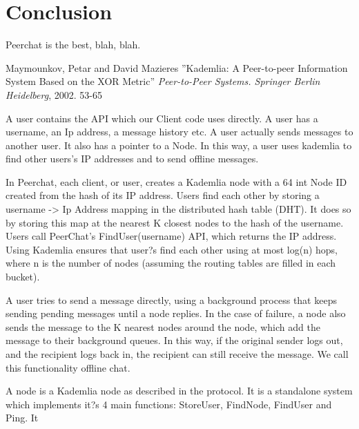 \documentclass{article}
\begin{document}
\section{Conclusion}

Peerchat is the best, blah, blah.

\begin{thebibliography}{99}
   Maymounkov, Petar and David Mazieres
   ''Kademlia: A Peer-to-peer Information System Based on the XOR Metric''
   \textit{Peer-to-Peer Systems. Springer Berlin Heidelberg}, 2002. 53-65
 
\end{thebibliography}

A user contains the API which our Client code uses directly. A user has a username, an Ip address, a message history etc. A user actually sends messages to another user. It also has a pointer to a Node. In this way, a user uses kademlia to find other users's IP addresses and to send offline messages.

In Peerchat, each client, or user, creates a Kademlia node with a 64 int Node ID created from the hash of its IP address. Users find each other by storing a username -> Ip Address mapping in the distributed hash table (DHT). It does so by storing this map at the nearest K closest nodes to the hash of the username. Users call PeerChat's FindUser(username) API, which returns the IP address. Using Kademlia ensures that user?s find each other using at most log(n) hops, where n is the number of nodes (assuming the routing tables are filled in each bucket). 

A user tries to send a message directly, using a background process that keeps sending pending messages until a node replies. In the case of failure, a node also sends the message to the K nearest nodes around the node, which add the message to their background queues. In this way, if the original sender logs out, and the recipient logs back in, the recipient can still receive the message. We call this functionality offline chat.

A node is a Kademlia node as described in the protocol. It is a standalone system which implements it?s 4 main functions: StoreUser, FindNode, FindUser and Ping. It 
\end{document}
